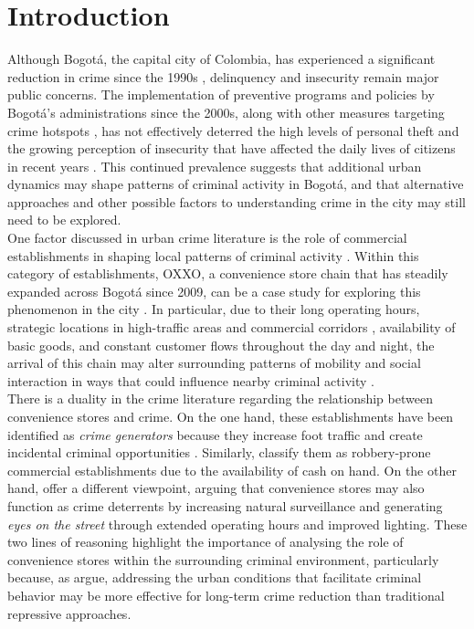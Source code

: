 \documentclass[12pt]{article}
\begin{document}
\newpage

\section{Introduction}

Although Bogotá, the capital city of Colombia, has experienced a significant reduction in crime since the 1990s \parencite{rodriguez2017ciudad, godoy2018security}, delinquency and insecurity remain major public concerns. The implementation of preventive programs and policies by Bogotá’s administrations since the 2000s, along with other measures targeting crime hotspots \parencite{godoy2018security}, has not effectively deterred the high levels of personal theft and the growing perception of insecurity that have affected the daily lives of citizens in recent years \parencite{CCB2026}. This continued prevalence suggests that additional urban dynamics may shape patterns of criminal activity in Bogotá, and that alternative approaches and other possible factors to understanding crime in the city may still need to be explored.\\

One factor discussed in urban crime literature is the role of commercial establishments in shaping local patterns of criminal activity \parencite{Dugato2026, askey2018fast, Nazzari2026, Wellford1997, Davis2021}. Within this category of establishments, OXXO, a convenience store chain that has steadily expanded across Bogotá since 2009, can be a case study for exploring this phenomenon in the city \parencite{godoy2025}. In particular, due to their long operating hours, strategic locations in high-traffic areas and commercial corridors \parencite{marcos2022}, availability of basic goods, and constant customer flows throughout the day and night, the arrival of this chain may alter surrounding patterns of mobility and social interaction in ways that could influence nearby criminal activity \parencite{Dugato2026, marcos2022}.\\

There is a duality in the crime literature regarding the relationship between convenience stores and crime. On the one hand, these establishments have been identified as \textit{crime generators} because they increase foot traffic and create incidental criminal opportunities \parencite{Dugato2026}. Similarly, \textcite{Wellford1997} classify them as robbery-prone commercial establishments due to the availability of cash on hand. On the other hand, \textcite{Davis2021} offer a different viewpoint, arguing that convenience stores may also function as crime deterrents by increasing natural surveillance and generating \textit{eyes on the street} through extended operating hours and improved lighting. These two lines of reasoning highlight the importance of analysing the role of convenience stores within the surrounding criminal environment, particularly because, as \textcite{Dugato2026} argue, addressing the urban conditions that facilitate criminal behavior may be more effective for long-term crime reduction than traditional repressive approaches.\\
\end{document}
